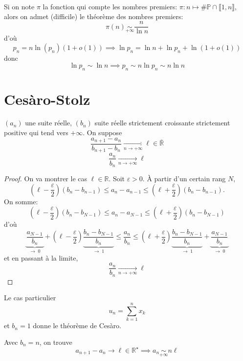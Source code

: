 \begin{rem}
    Si on note $\pi$ la fonction qui compte les nombres premiers: $\pi:n\longmapsto \#\mathbb P\cap\llbracket1,n\rrbracket$, alors on admet (difficile) le théorème des nombres premiers: \[
        \pi(n)\underset{+\infty}\sim \frac n{\ln n}
    \]
    d'où \[
    p_n=n\ln(p_n)(1+o(1))\implies \ln p_n=\ln n+\ln p_n+\ln(1+o(1))\] donc \[ \ln p_n\sim \ln n \implies p_n\sim n\ln p_n\sim n\ln n
    \]
\end{rem}

\section{Cesàro-Stolz}

\begin{thm}
    \Hyp $(a_n)$ une suite réelle, $(b_n)$ suite réelle strictement croissante strictement positive qui tend vers $+\infty$. On suppose \[
        \frac{a_{n+1}-a_n}{b_{n+1}-b_n}\xrightarrow[n\to+\infty]{}\ell\in\bar{\mathbb R}
    \]
    \Conc \[
        \frac{a_n}{b_n}\xrightarrow[n\to+\infty]{}\ell
    \]
\end{thm}

\begin{proof}
    On va montrer le cas $\ell\in\mathbb R$. Soit $\varepsilon>0$. À partir d'un certain rang $N$, \[
        \left(\ell-\frac\varepsilon2\right)(b_n-b_{n-1})\leq a_n-a_{n-1}\leq \left( \ell+\frac\varepsilon2 \right)(b_n-b_{n-1}).
    \]
    On somme: \[
        \left( \ell-\frac\varepsilon2 \right)(b_n-b_{N-1})\leq a_n-a_{N-1}\leq \left( \ell+\frac\varepsilon2 \right)(b_n-b_{N-1})
    \]
    d'où \[
        \underbrace{\frac{a_{N-1}}{b_n}}_{\to \; 0}+ \left( \ell-\frac\varepsilon2 \right)\underbrace{\frac{b_n-b_{N-1}}{b_n}}_{\to\;1}\leq \frac{a_n}{b_n}\leq \left( \ell+\frac\varepsilon2 \right)\underbrace{\frac{b_n-b_{N-1}}{b_n}}_{\to\;1}+\underbrace{\frac{a_{N-1}}{b_n}}_{\to\;0}
    \]
    et en passant à la limite, \[
        \frac{a_n}{b_n}\xrightarrow[n\to+\infty]{}\ell
    \]
\end{proof}

\begin{rem}
    Le cas particulier \[
        u_n=\sum_{k=1}^nx_k
    \]
    et $b_n=1$ donne le théorème de Cesàro.
\end{rem}

\begin{rem}
    Avec $b_n=n$, on trouve \[
        a_{n+1}-a_n\longrightarrow \ell\in\mathbb R^\star\implies a_n\underset{+\infty}\sim n\ell
    \]
\end{rem}

\endchapter
